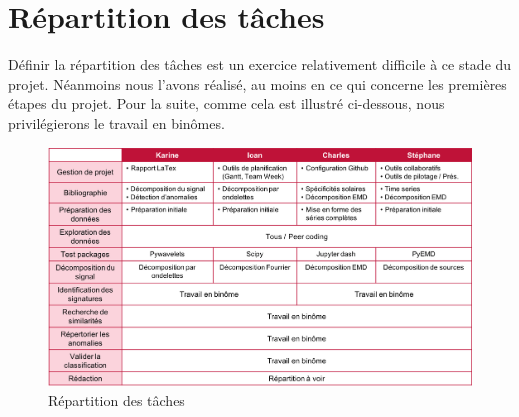 \section{Répartition des tâches}
Définir la répartition des tâches est un exercice relativement difficile à ce stade du projet. Néanmoins nous l'avons réalisé, au moins en ce qui concerne les premières étapes du projet. Pour la suite, comme cela est illustré ci-dessous, nous privilégierons le travail en binômes.


\begin{figure}[!ht]
\begin{center}
\includegraphics[scale=0.5]{rapport/images/Ch2_RepartitionTaches.png}
\end{center}
\caption{Répartition des tâches}
\end{figure}


